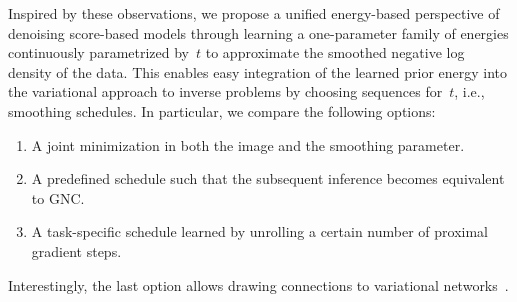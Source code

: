 \documentclass{article}
\theoremstyle{plain}
\theoremstyle{definition}
\theoremstyle{remark}
\begin{document}
Inspired by these observations, we propose a unified energy-based
perspective of denoising score-based models through learning a
one-parameter family of energies continuously parametrized by~$t$ to approximate the smoothed negative log density of the data.
This enables easy integration of the learned prior energy into the variational approach to inverse problems by choosing sequences for~$t$, i.e., smoothing schedules.
In particular, we compare the following options:
\begin{enumerate}
  \item A joint minimization in both the image and the smoothing
    parameter.
  \item A predefined schedule such that the subsequent inference
    becomes equivalent to GNC.
  \item A task-specific schedule learned by unrolling a certain
    number of proximal gradient steps.
\end{enumerate}
Interestingly, the last option allows drawing connections to
variational networks~\cite{ChPo16,KoKl17}.





    
\end{document}
